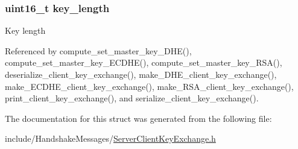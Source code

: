\subsubsection[{\texorpdfstring{key\+\_\+length}{key_length}}]{\setlength{\rightskip}{0pt plus 5cm}uint16\+\_\+t key\+\_\+length}\hypertarget{structclient__key__exchange__t_aaca3c65525352f552124c3d947b60dcb}{}\label{structclient__key__exchange__t_aaca3c65525352f552124c3d947b60dcb}
Key length 

Referenced by compute\+\_\+set\+\_\+master\+\_\+key\+\_\+\+D\+H\+E(), compute\+\_\+set\+\_\+master\+\_\+key\+\_\+\+E\+C\+D\+H\+E(), compute\+\_\+set\+\_\+master\+\_\+key\+\_\+\+R\+S\+A(), deserialize\+\_\+client\+\_\+key\+\_\+exchange(), make\+\_\+\+D\+H\+E\+\_\+client\+\_\+key\+\_\+exchange(), make\+\_\+\+E\+C\+D\+H\+E\+\_\+client\+\_\+key\+\_\+exchange(), make\+\_\+\+R\+S\+A\+\_\+client\+\_\+key\+\_\+exchange(), print\+\_\+client\+\_\+key\+\_\+exchange(), and serialize\+\_\+client\+\_\+key\+\_\+exchange().



The documentation for this struct was generated from the following file\+:\begin{DoxyCompactItemize}
\item 
include/\+Handshake\+Messages/\hyperlink{_server_client_key_exchange_8h}{Server\+Client\+Key\+Exchange.\+h}\end{DoxyCompactItemize}
